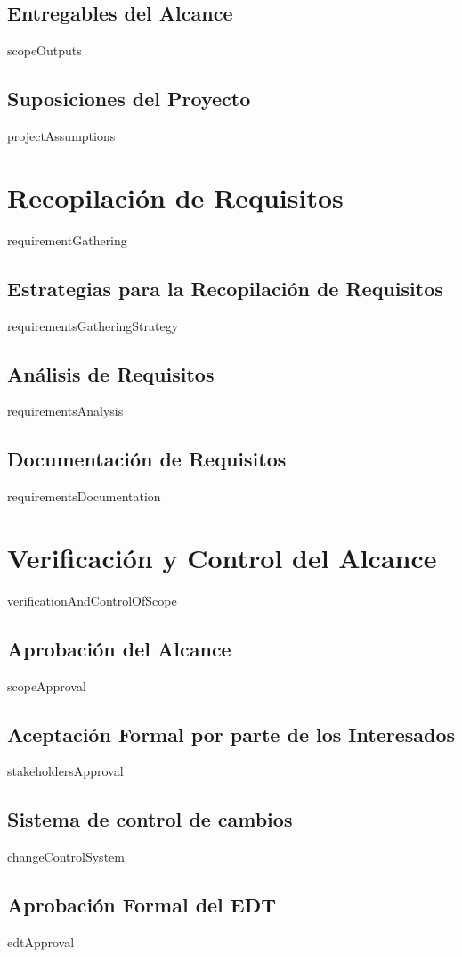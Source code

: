 \documentclass{article}
\begin{document}
\subsection{Entregables del Alcance}
{{scopeOutputs}}
\subsection{Suposiciones del Proyecto}
{{projectAssumptions}}

\section{Recopilación de Requisitos}
{{requirementGathering}}
\subsection{Estrategias para la Recopilación de Requisitos}
{{requirementsGatheringStrategy}}
\subsection{Análisis de Requisitos}
{{requirementsAnalysis}}
\subsection{Documentación de Requisitos}
{{requirementsDocumentation}}

\section{Verificación y Control del Alcance}
{{verificationAndControlOfScope}}
\subsection{Aprobación del Alcance}
{{scopeApproval}}
\subsection{Aceptación Formal por parte de los Interesados}
{{stakeholdersApproval}}
\subsection{Sistema de control de cambios}
{{changeControlSystem}}
\subsection{Aprobación Formal del EDT}
{{edtApproval}}
\end{document}
